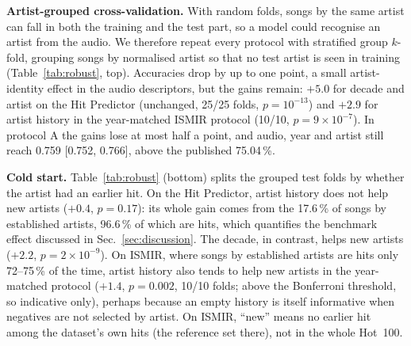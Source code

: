 \textbf{Artist-grouped cross-validation.} With random folds, songs by the same artist can
fall in both the training and the test part, so a model could recognise an artist from the
audio. We therefore repeat every protocol with stratified group $k$-fold, grouping songs by
normalised artist so that no test artist is seen in training (Table~\ref{tab:robust}, top).
Accuracies drop by up to one point, a small artist-identity effect in the audio
descriptors, but the gains remain: $+5.0$\pp{} for decade and artist on the Hit
Predictor (unchanged, 25/25 folds, $p=10^{-13}$) and $+2.9$\pp{} for artist history in the
year-matched ISMIR protocol (10/10, $p=9\times10^{-7}$). In protocol A the gains lose at
most half a point, and audio, year and artist still reach 0.759 [0.752, 0.766], above the
published 75.04\,\%.

\textbf{Cold start.} Table~\ref{tab:robust} (bottom) splits the grouped test folds by
whether the artist had an earlier hit. On the Hit Predictor, artist history does not help
new artists ($+0.4$\pp, $p=0.17$): its whole gain comes from the 17.6\,\% of songs by
established artists, 96.6\,\% of which are hits, which quantifies the benchmark effect
discussed in Sec.~\ref{sec:discussion}. The decade, in contrast, helps new artists
($+2.2$\pp, $p=2\times10^{-9}$). On ISMIR, where songs by established artists are hits
only 72--75\,\% of the time, artist history also tends to help new artists in the year-matched
protocol ($+1.4$\pp, $p=0.002$, 10/10 folds; above the Bonferroni threshold, so indicative only), perhaps
because an empty history is itself informative when negatives are not selected by artist. On ISMIR, ``new''
means no earlier hit among the dataset's own hits (the reference set there), not in the whole Hot~100.


\FloatBarrier
